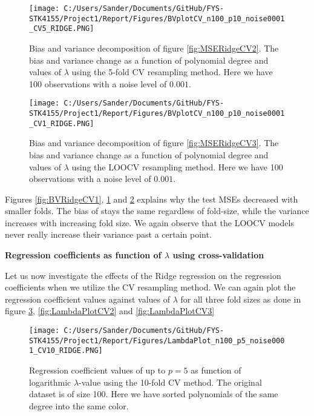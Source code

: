 \documentclass[12pt,a4paper]{article}
\begin{document}
\begin{figure}[H]
\centering
\texttt{[image: C:/Users/Sander/Documents/GitHub/FYS-STK4155/Project1/Report/Figures/BVplotCV\_n100\_p10\_noise0001\_CV5\_RIDGE.PNG]}
\caption{\label{fig:BVRidgeCV2} Bias and variance decomposition of figure \ref{fig:MSERidgeCV2}. The bias and variance change as a function of polynomial degree and values of $\lambda$ using the 5-fold CV resampling method. Here we have 100 observations with a noise level of $0.001$.}
\end{figure}

\begin{figure}[H]
\centering
\texttt{[image: C:/Users/Sander/Documents/GitHub/FYS-STK4155/Project1/Report/Figures/BVplotCV\_n100\_p10\_noise0001\_CV1\_RIDGE.PNG]}
\caption{\label{fig:BVRidgeCV3} Bias and variance decomposition of figure \ref{fig:MSERidgeCV3}. The bias and variance change as a function of polynomial degree and values of $\lambda$ using the LOOCV resampling method. Here we have 100 observations with a noise level of $0.001$.}
\end{figure}

\noindent Figures \ref{fig:BVRidgeCV1}, \ref{fig:BVRidgeCV2} and \ref{fig:BVRidgeCV3} explains why the test MSEs decreased with smaller folds. The bias of stays the same regardless of fold-size, while the variance increases with increasing fold size. We again observe that the LOOCV models never really increase their variance past a certain point. 

\begin{center}
\large{\textbf{Regression coefficients as function of $\lambda$ using cross-validation}}
\end{center}

\noindent Let us now investigate the effects of the Ridge regression on the regression coefficients when we utilize the CV resampling method. We can again plot the regression coefficient values against values of $\lambda$ for all three fold sizes as done in figure \ref{fig:LambdaPlotCV1}, \ref{fig:LambdaPlotCV2} and \ref{fig:LambdaPlotCV3}

\begin{figure}[H]
\centering
\texttt{[image: C:/Users/Sander/Documents/GitHub/FYS-STK4155/Project1/Report/Figures/LambdaPlot\_n100\_p5\_noise0001\_CV10\_RIDGE.PNG]}
\caption{\label{fig:LambdaPlotCV1} Regression coefficient values of up to $p = 5$ as function of logarithmic $\lambda$-value using the 10-fold CV method. The original dataset is of size 100. Here we have sorted polynomials of the same degree into the same color.}
\end{figure}
\end{document}
